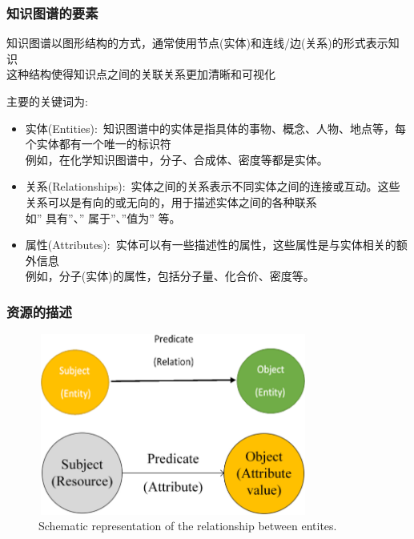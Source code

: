\frame
{
	\frametitle{知识图谱的要素}
知识图谱以图形结构的方式，通常使用节点(实体)和连线/边(关系)的形式表示知识\\
这种结构使得知识点之间的关联关系更加清晰和可视化

主要的关键词为:
\begin{itemize}
	\item 实体\textrm{(Entities)}:~知识图谱中的实体是指具体的事物、概念、人物、地点等，每个实体都有一个唯一的标识符\\
		例如，在化学知识图谱中，分子、合成体、密度等都是实体。
	\item 关系\textrm{(Relationships)}:~实体之间的关系表示不同实体之间的连接或互动。这些关系可以是有向的或无向的，用于描述实体之间的各种联系\\
		如” 具有”、” 属于”、”值为” 等。
	\item 属性\textrm{(Attributes)}:~实体可以有一些描述性的属性，这些属性是与实体相关的额外信息\\
		例如，分子(实体)的属性，包括分子量、化合价、密度等。
\end{itemize}
}

\frame
{
	\frametitle{资源的描述}
\begin{figure}[h!]
\centering
\vskip -8pt
\includegraphics[height=2.35in,width=3.50in,viewport=0 0 690 470,clip]{Figures/KG-Entity-relation_0.png}
\caption{\tiny\textrm{Schematic representation of the relationship between entites.}}%
\label{Fig:KG-Entity-relations}
\end{figure}
}

